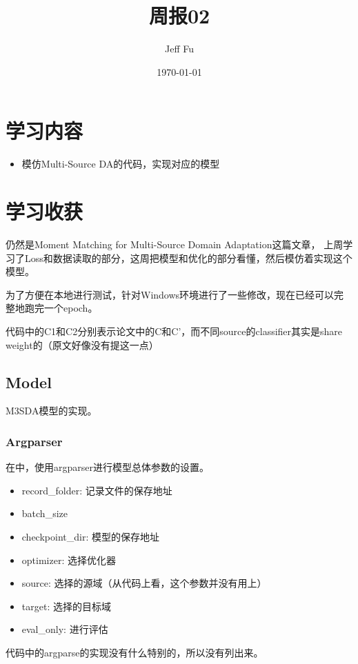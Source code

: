 \documentclass[UTF8]{ctexart}
\title{周报02}
\author{Jeff Fu}
\date{\today}
\begin{document}
    \maketitle
    \section{学习内容}
        \begin{itemize}
            \item 模仿Multi-Source DA的代码，实现对应的模型
        \end{itemize}
    \section{学习收获}
        仍然是Moment Matching for Multi-Source Domain Adaptation这篇文章，
        上周学习了Loss和数据读取的部分，这周把模型和优化的部分看懂，然后模仿着实现这个模型。

        为了方便在本地进行测试，针对Windows环境进行了一些修改，现在已经可以完整地跑完一个epoch。

        代码中的C1和C2分别表示论文中的C和C'，而不同source的classifier其实是share weight的（原文好像没有提这一点）
        \subsection{Model}
            M3SDA模型的实现。
            \subsubsection{Argparser}
                在中，使用argparser进行模型总体参数的设置。
                \begin{itemize}
                    \item record\_folder: 记录文件的保存地址
                    \item batch\_size
                    \item checkpoint\_dir: 模型的保存地址
                    \item optimizer: 选择优化器
                    \item source: 选择的源域（从代码上看，这个参数并没有用上）
                    \item target: 选择的目标域
                    \item eval\_only: 进行评估
                \end{itemize}

                代码中的argparse的实现没有什么特别的，所以没有列出来。
\end{document}
